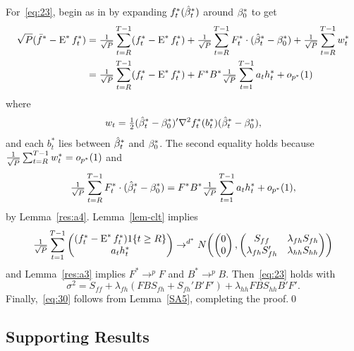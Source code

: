 \documentclass[12pt,fleqn]{article}
\begin{document}
For~\eqref{eq:23}, begin as in \citet{Wes:96} by expanding
$f_t^{*}(\hat \beta_t^*)$ around $\beta_0^*$ to get
  \begin{align*}
    \sqrt{P} (\bar f^* - \operatorname{E}^* f_t^*)
    &= \tfrac{1}{\sqrt{P}} \sum_{t=R}^{T-1} (f_t^{*} - \operatorname{E}^* f_t^*)
     + \tfrac{1}{\sqrt{P}} \sum_{t=R}^{T-1} F_t^* \cdot (\hat \beta_t^* - \beta_0^*)
     + \tfrac{1}{\sqrt{P}} \sum_{t=R}^{T-1} w_t^* \\
    &= \tfrac{1}{\sqrt{P}} \sum_{t=R}^{T-1} (f_t^{*} - \operatorname{E}^* f_t^*)
     + F^* B^* \tfrac{1}{\sqrt{P}} \sum_{t=1}^{T-1} a_t h_t^* + o_{p^*}(1)
  \end{align*}
  where
  \begin{equation*}
    w_{t} = \tfrac12 (\hat \beta_t^* - \beta_0^*)' \nabla^2 f_{t}^*(b_{t}^*) (\hat \beta_t^* - \beta_0^*),
  \end{equation*}
  and each $b_{t}^*$ lies between $\hat \beta_t^*$ and $\beta_0^*$. The second equality holds because
  $\tfrac{1}{\sqrt{P}} \sum_{t=R}^{T-1} w_t^* = o_{p^*}(1)$ and
  \begin{equation*}
    \tfrac{1}{\sqrt{P}} \sum_{t=R}^{T-1} F_t^* \cdot (\hat \beta_t^* - \beta_0^*)
    = F^* B^* \tfrac{1}{\sqrt{P}} \sum_{t=1}^{T-1} a_t h_t^* + o_{p^*}(1),
  \end{equation*}
  by Lemma~\ref{res:a4}. Lemma~\ref{lem-clt} implies
  \begin{equation}\label{eq:19}
    \tfrac{1}{\sqrt{P}} \sum_{t=1}^{T-1} \begin{pmatrix}
      (f_t^* - \operatorname{E}^* f_t^*) 1\{t \geq R\} \\ a_t h_t^*
    \end{pmatrix} \to^{d^*}
    N\!
    \begin{pmatrix}
      \begin{pmatrix} 0 \\ 0 \end{pmatrix},
      \begin{pmatrix}
        S_{ff} & \lambda_{fh} S_{fh} \\
        \lambda_{fh} S_{fh}' &  \lambda_{hh} S_{hh}
      \end{pmatrix}
    \end{pmatrix}
  \end{equation}
  and Lemma~\ref{res:a3} implies $F^* \to^p F$ and $B^* \to^p
  B$. Then~\eqref{eq:23} holds with
  \begin{equation*}
    \sigma^2 = S_{ff} + \lambda_{fh} (F B S_{fh} + S_{fh}' B'F') + \lambda_{hh} F B S_{hh} B' F'.
  \end{equation*}
  Finally,~\eqref{eq:30} follows from Lemma~\ref{SA5}, completing the
  proof.\qed

\subsection{Supporting Results}
\end{document}
